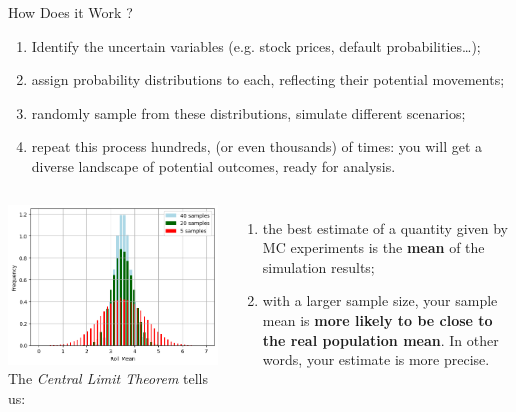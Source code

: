 \documentclass{beamer}
\begin{document}
\begin{frame}{How Does it Work ?}
\begin{enumerate}
	\item Identify the uncertain variables (e.g. stock prices, default probabilities\ldots);
	\item assign probability distributions to each, reflecting their potential movements;
	\item randomly sample from these distributions, simulate different scenarios;
	\item repeat this process hundreds, (or even thousands) of times: you will get a diverse landscape of potential outcomes, ready for analysis.
\end{enumerate}
\vspace{0.25cm}
\begin{columns}
	\hfill
	\includegraphics[width=0.8\linewidth]{central_limit_theorem}
	The \emph{Central Limit Theorem} tells us:
	\begin{enumerate}
		\item the best estimate of a quantity given by MC experiments is the \textbf{mean} of the simulation results;
		\item with a larger sample size, your sample mean is \textbf{more likely to be close to the real population mean}. In other words, your estimate is more precise.
	\end{enumerate}
\end{columns}
\end{frame}
\end{document}

